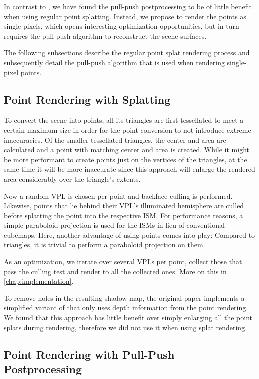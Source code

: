 In contrast to \citet{ritschel2008ism}, we have found the pull-push postprocessing to be of little benefit when using regular point splatting. Instead, we propose to render the points as single pixels, which opens interesting optimization opportunities, but in turn requires the pull-push algorithm to reconstruct the scene surfaces.

The following subsections describe the regular point splat rendering process and subsequently detail the pull-push algorithm that is used when rendering single-pixel points.


\subsection{Point Rendering with Splatting}

To convert the scene into points, all its triangles are first tessellated to meet a certain maximum size in order for the point conversion to not introduce extreme inaccuracies. Of the smaller tessellated triangles, the center and area are calculated and a point with matching center and area is created. While it might be more performant to create points just on the vertices of the triangles, at the same time it will be more inaccurate since this approach will enlarge the rendered area considerably over the triangle's extents.

Now a random VPL is chosen per point and backface culling is performed. Likewise, points that lie behind their VPL's illuminated hemisphere are culled before splatting the point into the respective ISM. For performance reasons, a simple paraboloid projection is used for the ISMs in lieu of conventional cubemaps. Here, another advantage of using points comes into play: Compared to triangles, it is trivial to perform a paraboloid projection on them.

As an optimization, we iterate over several VPLs per point, collect those that pass the culling test and render to all the collected ones. More on this in \cref{chap:implementation}.

To remove holes in the resulting shadow map, the original paper implements a simplified variant of \citet{Marroquim:2007:reconstruction} that only uses depth information from the point rendering. We found that this approach has little benefit over simply enlarging all the point splats during rendering, therefore we did not use it when using splat rendering.



\subsection{Point Rendering with Pull-Push Postprocessing}

